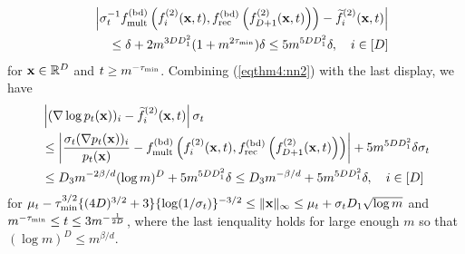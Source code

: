 \documentclass[twoside,11pt]{article}
\newcommand{\bx}{{\bf x}}
\newcommand{\bbR}{{\mathbb R}}
\newcommand{\be}{\begin{equation}}
\newcommand{\ee}{\end{equation}}
\newcommand{\bean}{\setlength\arraycolsep{1pt}\begin{eqnarray*}}
\newcommand{\eean}{\end{eqnarray*}}
\begin{document}
\bean
&& \left\vert \sigma_{t}^{-1} f_{{\rm mult}}^{(\rm bd)} \left( f_i^{(2)}(\bx,t) ,  f_{\rm rec}^{(\rm bd)}\left(f_{D+1}^{(2)}(\bx,t) \right) \right) - \widetilde f^{(2)}_{i}(\bx,t) \right\vert
\\
&& \leq \delta +  2  m^{3DD_{1}^2} (1+  m^{2\tau_{\rm min}}) \delta \leq 5 m^{5D D_{1}^2} \delta, \quad i \in [D]
\eean
for $\bx \in \bbR^{D}$ and $t \geq m^{-\tau_{\rm min}}$.
Combining (\ref{eqthm4:nn2}) with the last display, we have
\be \begin{split}
&  \left\vert (\nabla \log p_t(\bx))_{i} - \widetilde f_{i}^{(2)}(\bx,t)  \right\vert \sigma_{t}
\\
& \leq \left\vert \frac{\sigma_t (\nabla p_t(\bx))_{i}}{p_t(\bx)} - f_{{\rm mult}}^{(\rm bd)} \left( f_i^{(2)}(\bx,t) ,  f_{\rm rec}^{(\rm bd)}\left(f_{D+1}^{(2)}(\bx,t) \right) \right)  \right\vert +  5 m^{5D D_{1}^2} \delta \sigma_{t}
\\
& \leq D_{3} m^{-2\beta/d} (\log m)^{D} + 5 m^{5D D_{1}^2} \delta \leq D_{3} m^{-\beta/d} + 5 m^{5D D_{1}^2} \delta, \quad i \in [D]
\label{eqthm4:nnpt2err}
\end{split} \ee
for $\mu_t-  \tau_{\rm min}^{3/2} \{    (4D)^{3/2} +3  \} \{ \log (1/\sigma_t)\}^{-3/2} \leq  \|\bx\|_{\infty} \leq \mu_t + \sigma_t D_{1} \sqrt{\log m}$ and $m^{-\tau_{\rm min}} \leq t \leq  3 m^{-\frac{1}{2D}}$, where the last ienquality holds for large enough $m$ so that $(\log m)^{D} \leq m^{\beta/d}$.

\end{document}
